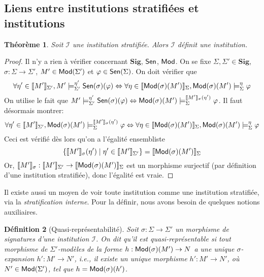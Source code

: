 \documentclass[11pt,a4paper]{article}
\newtheorem{theo}{Théorème}
\newtheorem{defi}[theo]{Définition}
\newcommand{\ph}{\varphi}
\newcommand{\gr}{\textbf}
\newcommand{\il}{\textit}
\newcommand{\I}{\mathcal{I}}
\renewcommand{\iff}{\Leftrightarrow}
\newcommand{\lb}{\llbracket}
\newcommand{\rb}{\rrbracket}
\newcommand{\info}[1]{\text{{\fontfamily{lmss}\selectfont #1}}}
\newcommand{\Mod}{\info{Mod}}
\newcommand{\Sen}{\info{Sen}}
\newcommand{\1}{\mathbbm{1}}
\begin{document}
\subsection{Liens entre institutions stratifiées et institutions}
\begin{theo}
Soit $\I$ une institution stratifiée. Alors $\I$ définit une institution.
\end{theo} 
\begin{proof}
Il n'y a rien à vérifier concernant $\gr{Sig}$, $\Sen$, $\Mod$. On se fixe $\Sigma,\Sigma' \in \gr{Sig}$, $\sigma : \Sigma \to \Sigma'$, $M' \in \Mod(\Sigma')$ et $\ph \in \Sen(\Sigma)$. On doit vérifier que
\[ \forall \eta' \in \lb M' \rb_{\Sigma'}, M' \models^{\eta'}_{\Sigma'} \Sen(\sigma)(\ph) \iff \forall \eta \in \lb \Mod(\sigma)(M') \rb_\Sigma, \Mod(\sigma)(M') \models^\eta_\Sigma \ph \] 
On utilise le fait que $M' \models_{\Sigma'}^{\eta'} \Sen(\sigma)(\ph) \iff \Mod(\sigma)(M') \models_\Sigma^{\lb M' \rb_\sigma (\eta')} \ph$. Il faut désormais montrer:
\[ \forall \eta' \in \lb M' \rb_{\Sigma'}, \Mod(\sigma)(M') \models_\Sigma^{\lb M' \rb_\sigma (\eta')} \ph \iff \forall \eta \in \lb \Mod(\sigma)(M') \rb_\Sigma, \Mod(\sigma)(M') \models^\eta_\Sigma \ph \]
Ceci est vérifié dès lors qu'on a l'égalité ensembliste 
\[ \{ \lb M' \rb_\sigma(\eta') \mid \eta' \in \lb M' \rb_{\Sigma'} \} = \lb \Mod(\sigma)(M') \rb_\Sigma \] Or, $\lb M' \rb_\sigma : \lb M' \rb_{\Sigma'} \to \lb \Mod(\sigma)(M') \rb_\Sigma$ est un morphisme surjectif (par définition d'une institution stratifiée), donc l'égalité est vraie.
\end{proof}
Il existe aussi un moyen de voir toute institution comme une institution stratifiée, via la \il{stratification interne}. Pour la définir, nous avons besoin de quelques notions auxiliaires.
\begin{defi}[Quasi-représentabilité]
Soit $\sigma : \Sigma \to \Sigma'$ un morphisme de signatures d'une institution $\I$. On dit qu'il est \il{quasi-représentable} si tout morphisme de $\Sigma'$-modèles de la forme $h : \Mod(\sigma)(M') \to N$ a une unique $\sigma$-expansion $h' : M' \to N'$, i.e., il existe un unique morphisme $h' : M' \to N'$, où $N' \in \Mod(\Sigma')$, tel que $h = \Mod(\sigma)(h')$. 
\end{defi}
\end{document}
